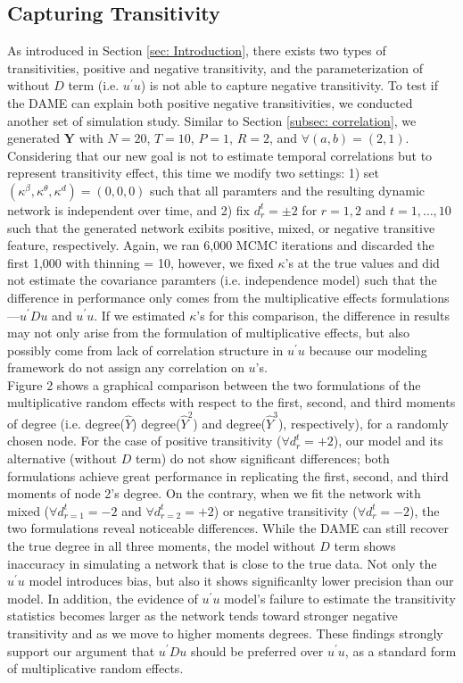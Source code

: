 \documentclass[a4paper]{article}
\begin{document}
\subsection{Capturing Transitivity} \label{subsec: negative transitivity}
As introduced in Section \ref{sec: Introduction}, there exists two types of transitivities, positive and negative transitivity, and the parameterization of without $D$ term (i.e. $u^\prime u$) is not able to capture negative transitivity. To test if the DAME can explain both positive negative transitivities, we conducted another set of simulation study. Similar to Section \ref{subsec: correlation}, we generated  $\mathbf{Y}$ with $N=20$, $T=10$, $P=1$, $R=2$, and $\forall (a, b) = (2, 1)$. Considering that our new goal is not to estimate temporal correlations but to represent transitivity effect, this time we modify two settings: 1) set $(\kappa^\beta, \kappa^\theta, \kappa^d) = (0, 0, 0)$ such that all paramters and the resulting dynamic network is independent over time, and 2) fix $d^t_{r} = \pm 2$ for $r=1,2$ and $t=1,\ldots,10$ such that the generated network exibits positive, mixed, or negative transitive feature, respectively. Again, we ran 6,000 MCMC iterations and discarded the first 1,000 with thinning = 10, however, we fixed $\kappa$'s at the true values and did not estimate the covariance paramters (i.e. independence model) such that the difference in performance only comes from the multiplicative effects formulations---$u^\prime Du$ and $u^\prime u$. If we estimated $\kappa$'s for this comparison, the difference in results may not only arise from the formulation of multiplicative effects, but also possibly come from lack of correlation structure in $u^\prime u$ because our modeling framework do not assign any correlation on $u$'s.   \\ \newline 
Figure 2 shows a graphical comparison between the two formulations of the multiplicative random effects with respect to the first, second, and third moments of degree (i.e. degree($\hat{Y}$) degree($\hat{Y}^2$) and degree($\hat{Y}^3$), respectively), for a randomly chosen node. For the case of positive transitivity ($\forall d^t_{r} =+2$), our model and its alternative (without $D$ term) do not show significant differences; both formulations achieve great performance in replicating the first, second, and third moments of node 2's degree. On the contrary, when we fit the network with mixed ($\forall d^t_{r=1} =-2$ and $\forall d^t_{r=2} =+2$) or negative transitivity ($\forall d^t_{r} =-2$), the two formulations reveal noticeable differences. While the DAME can still recover the true degree in all three moments, the model without $D$ term shows inaccuracy in simulating a network that is close to the true data. Not only the $u^\prime u$ model introduces bias, but also it shows significanlty lower precision than our model. In addition, the evidence of $u^\prime u$ model's failure to estimate the transitivity statistics becomes larger as the network tends toward stronger negative transitivity and as we move to higher moments degrees. These findings strongly support our argument that $u^\prime Du$ should be preferred over $u^\prime u$, as a standard form of multiplicative random effects.
\end{document}
